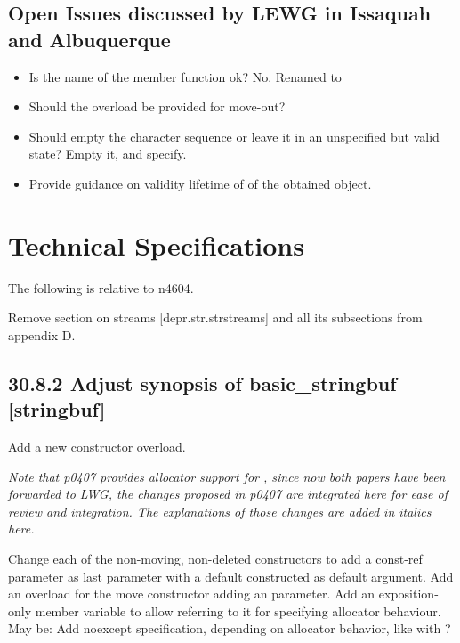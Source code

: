 \documentclass[ebook,11pt,article]{memoir}
\begin{document}
\section{Open Issues discussed by LEWG in Issaquah and Albuquerque}
\begin{itemize}
\item Is the name of the  member function ok? No. Renamed to 
\item Should the  overload be provided for move-out? 
\item Should  empty the character sequence or leave it in an unspecified but valid state? Empty it, and specify.
\item Provide guidance on validity lifetime of of the obtained  object.
\end{itemize}

\chapter{Technical Specifications}
The following is relative to n4604.

Remove section on  streams [depr.str.strstreams] and all its subsections from appendix D.

\section{30.8.2 Adjust synopsis of basic\_stringbuf [stringbuf]}
Add a new constructor overload.

\textit{Note that p0407 provides allocator support for , since now both papers have been forwarded to LWG, the changes proposed in p0407 are integrated here for ease of review and integration. The explanations of those changes are added in italics here.}

\begin{em}
Change each of the non-moving, non-deleted constructors to add a const-ref  parameter as last parameter with a default constructed  as default argument. Add an overload for the move constructor adding an  parameter. Add an exposition-only member variable  to allow referring to it for specifying allocator behaviour. May be: Add noexcept specification, depending on allocator behavior, like with ?
\end{em}
\end{document}
